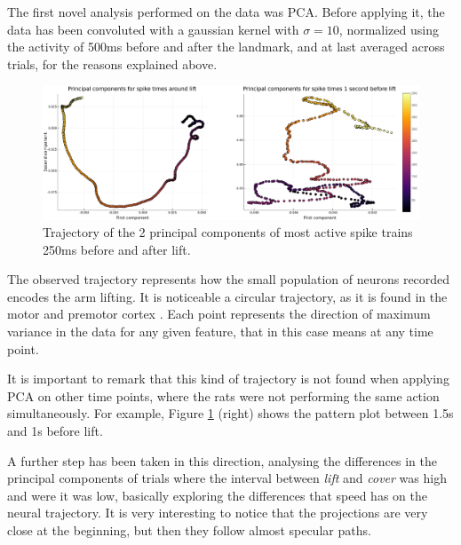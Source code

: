 
The first novel analysis performed on the data was PCA.	Before applying it, the data has been convoluted with a gaussian kernel with $\sigma=10$, normalized using the activity of 500ms before and after the landmark, and at last averaged across trials, for the reasons explained above.
\begin{figure}[h!]
	\centering
	\includegraphics[width=6in]{../../plots/pca-lift-vs-non-lift.pdf}
	\caption{Trajectory of the 2 principal components of most active spike trains 250ms before and after lift. 
}
	\label{fig:pca-500}
\end{figure}

The observed trajectory represents \cite{cunningham2014dimensionality} how the small population of neurons recorded encodes the arm lifting. It is noticeable a circular trajectory, as it is found in the motor and premotor cortex \cite{churchland2012neural}. 
Each point represents the direction of maximum variance in the data for any given feature, that in this case means at any time point. 

It is important to remark that this kind of trajectory is not found when applying PCA on other time points, where the rats were not performing the same action simultaneously. For example, Figure \ref{fig:pca-500} (right) shows the pattern plot between 1.5s and 1s before lift.


A further step has been taken in this direction, analysing the differences in the principal components of trials where the interval between \emph{lift} and \emph{cover} was high and were it was low, basically exploring the differences that speed has on the neural trajectory.
It is very interesting to notice that the projections are very close at the beginning, but then they follow almost specular paths.


